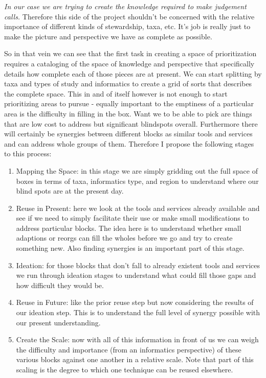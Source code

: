 \documentclass[10pt,a5paper]{book}
\begin{document}
\textit{In our case we are trying to create the knowledge required to make judgement calls.} Therefore this side of the project shouldn't be concerned with the relative importance of different kinds of stewardship, taxa, etc. It's job is really just to make the picture and perspective we have as complete as possible.

So in that vein we can see that the first task in creating a space of prioritization requires a cataloging of the space of knowledge and perspective that specifically details how complete each of those pieces are at present. We can start splitting by taxa and types of study and informatics to create a grid of sorts that describes the complete space. This in and of itself however is not enough to start prioritizing areas to pursue - equally important to the emptiness of a particular area is the difficulty in filling in the box. Want we to be able to pick are things that are low cost to address but significant blindspots overall. Furthermore there will certainly be synergies between different blocks as similar tools and services and can address whole groups of them. Therefore I propose the following stages to this process:

\begin{enumerate}
\item {Mapping the Space}: in this stage we are simply gridding out the full space of boxes in terms of taxa, informatics type, and region to understand where our blind spots are at the present day.
\item {Reuse in Present}: here we look at the tools and services already available and see if we need to simply facilitate their use or make small modifications to address particular blocks. The idea here is to understand whether small adaptions or reorgs can fill the wholes before we go and try to create something new. Also finding synergies is an important part of this stage.
\item {Ideation}: for those blocks that don't fall to already existent tools and services we run through ideation stages to understand what could fill those gaps and how difficult they would be. 
\item {Reuse in Future}: like the prior reuse step but now considering the results of our ideation step. This is to understand the full level of synergy possible with our present understanding.
\item {Create the Scale}: now with all of this information in front of us we can weigh the difficulty and importance (from an informatics perspective) of these various blocks against one another in a relative scale. Note that part of this scaling is the degree to which one technique can be reused elsewhere. 
\end{enumerate}
\end{document}
